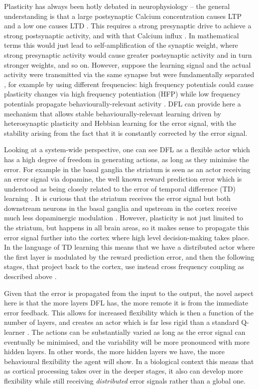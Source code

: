 \documentclass{article}
\begin{document}
Plasticity has always been hotly debated in neurophysiology -- the
general understanding is that a large postsynaptic Calcium
concentration causes LTP \cite{Malenka99,Bennett2000} and a low one
causes LTD \cite{Mulkey1992}. This requires a strong presynaptic drive
to achieve a strong postsynaptic activity, and with that Calcium
influx \cite{Meunier2017}. In mathematical terms this would just lead
to self-amplification of the synaptic weight, where strong presynaptic
activity would cause greater postsynaptic activity and in turn
stronger weights, and so on. However, suppose the learning signal and
the actual activity were transmitted via the same synapse but were
fundamentally separated \cite{Lindsay2017}, for example by using
different frequencies: high frequency potentials could cause
plasticity changes via high frequency potentiation (HFP) while low
frequency potentials propagate behaviourally-relevant activity
\cite{Canolty2010}. DFL can provide here a mechanism that allows
stable behaviourally-relevant learning driven by heterosynaptic
plasticity and Hebbian learning for the error signal, with the
stability arising from the fact that it is constantly corrected by the
error signal.

Looking at a system-wide perspective, one can see DFL as a flexible
actor which has a high degree of freedom in generating actions, as long as they
minimise the error. For example in the basal ganglia the striatum is
seen as an actor receiving an error signal via dopamine, the well known
reward prediction error \cite{Schultz97} which is understood as being
closely related to the error of temporal difference (TD) learning
\cite{gurney98:_basal_gangl_action_selec_devic}. It is curious that
the striatum receives the error signal but both downstream neurons in
the basal ganglia and upstream in the cortex receive much less
dopaminergic modulation \cite{Beckstead1979}. However, plasticity is
not just limited to the striatum, but happens in all brain areas, so
it makes sense to propagate this error signal further into the cortex
\cite{Groenewegen1993} where high level decision-making takes place.
In the language of TD learning \cite{Sutton87} this means that we
have a distributed actor where the first layer is modulated by the
reward prediction error, and then the following stages, that project
back to the cortex, use instead cross frequency coupling
as described above \cite{Lipski2017}.

Given that the error is propagated from the input to the output, the
novel aspect here is that the more layers DFL has, the more remote it
is from the immediate error feedback. This allows for increased
flexibility which is then a function of the number of layers, and
creates an actor which is far less rigid than a standard Q-learner
\cite{Dayan1992}. The actions can be substantially varied as long as
the error signal can eventually be minimised, and the variability will
be more pronounced with more hidden layers. In other words, the more
hidden layers we have, the more behavioural flexibility the agent will
show. In a biological context this means that as cortical processing
takes over in the deeper stages, it also can develop more flexibility
while still receiving \textsl{distributed} error signals rather than a
global one.
\end{document}
